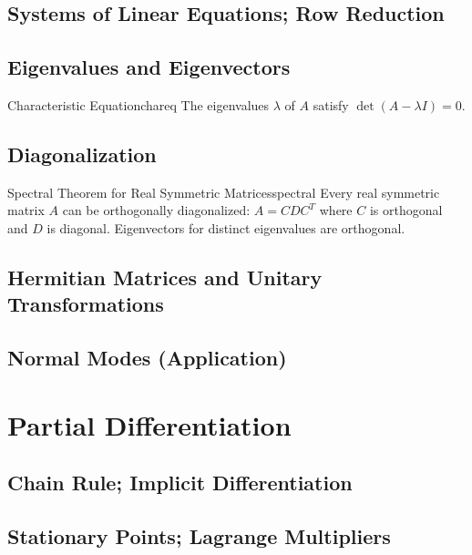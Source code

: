 \documentclass[11pt, letterpaper]{article}
\theoremstyle{plain}
\begin{document}
\subsection{Systems of Linear Equations; Row Reduction}

\subsection{Eigenvalues and Eigenvectors}

\begin{definition}{Characteristic Equation}{chareq}
  The eigenvalues $\lambda$ of $A$ satisfy $\det(A - \lambda I) = 0$.
\end{definition}

\subsection{Diagonalization}

\begin{theorem}{Spectral Theorem for Real Symmetric Matrices}{spectral}
  Every real symmetric matrix $A$ can be orthogonally diagonalized:
  $A = C D C^T$ where $C$ is orthogonal and $D$ is diagonal.
  Eigenvectors for distinct eigenvalues are orthogonal.
\end{theorem}

\subsection{Hermitian Matrices and Unitary Transformations}

\subsection{Normal Modes (Application)}


\section{Partial Differentiation}         %

\subsection{Chain Rule; Implicit Differentiation}

\subsection{Stationary Points; Lagrange Multipliers}
\end{document}

